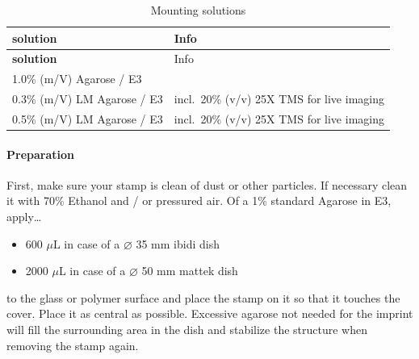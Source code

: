 \documentclass[11pt,singlespacinge,twoside]{reedthesis} %
\providecommand{\tightlist}{%
  \setlength{\itemsep}{0pt}\setlength{\parskip}{0pt}}
\begin{document}
\begin{longtable}[]{@{}ll@{}}
\caption{\label{tab:mountsol} Mounting solutions}\tabularnewline
\toprule
\begin{minipage}[b]{0.45\columnwidth}\raggedright
\textbf{solution}\strut
\end{minipage} & \begin{minipage}[b]{0.49\columnwidth}\raggedright
Info\strut
\end{minipage}\tabularnewline
\midrule
\endfirsthead
\toprule
\begin{minipage}[b]{0.45\columnwidth}\raggedright
\textbf{solution}\strut
\end{minipage} & \begin{minipage}[b]{0.49\columnwidth}\raggedright
Info\strut
\end{minipage}\tabularnewline
\midrule
\endhead
\begin{minipage}[t]{0.45\columnwidth}\raggedright
1.0\% (m/V) Agarose / E3\strut
\end{minipage} & \begin{minipage}[t]{0.49\columnwidth}\raggedright
\strut
\end{minipage}\tabularnewline
\begin{minipage}[t]{0.45\columnwidth}\raggedright
0.3\% (m/V) LM Agarose / E3\strut
\end{minipage} & \begin{minipage}[t]{0.49\columnwidth}\raggedright
incl.~20\% (v/v) 25X TMS for live imaging\strut
\end{minipage}\tabularnewline
\begin{minipage}[t]{0.45\columnwidth}\raggedright
0.5\% (m/V) LM Agarose / E3\strut
\end{minipage} & \begin{minipage}[t]{0.49\columnwidth}\raggedright
incl.~20\% (v/v) 25X TMS for live imaging\strut
\end{minipage}\tabularnewline
\bottomrule
\end{longtable}
\hypertarget{preparation}{%
\paragraph{Preparation}\label{preparation}}

First, make sure your stamp is clean of dust or other particles. If necessary clean it with 70\% Ethanol and / or pressured air. Of a 1\% standard Agarose in E3, apply\ldots{}
\begin{itemize}
\tightlist
\item
  600 \(\mu\)L in case of a \(\varnothing\) 35 mm ibidi dish
\item
  2000 \(\mu\)L in case of a \(\varnothing\) 50 mm mattek dish
\end{itemize}
to the glass or polymer surface and place the stamp on it so that it touches the cover. Place it as central as possible. Excessive agarose not needed for the imprint will fill the surrounding area in the dish and stabilize the structure when removing the stamp again.
\end{document}
